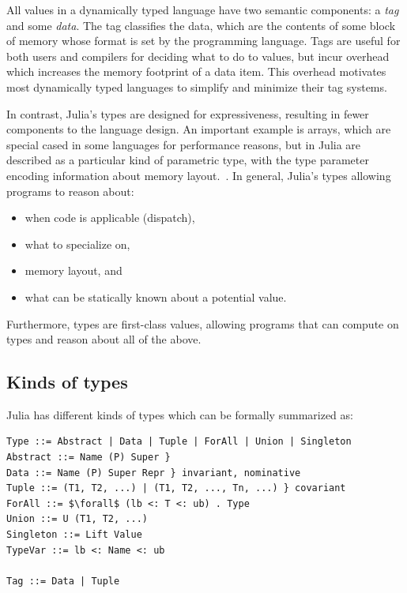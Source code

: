 \documentclass[pldi]{sigplanconf-pldi15}
\begin{document}
All values in a dynamically typed language have two semantic components:
a \emph{tag} and some \emph{data}. The tag classifies the data, which are the
contents of some block of memory whose format is set by the programming
language. Tags are useful for both users and compilers for deciding what to do
to values, but incur overhead which increases the memory footprint of a data
item. This overhead motivates most dynamically typed languages to simplify and
minimize their tag systems.

In contrast, Julia's types are designed for expressiveness, resulting in fewer
components to the language design. An important example is arrays, which are
special cased in some languages for performance reasons, but in Julia are
described as a particular kind of parametric type, with the type parameter
encoding information about memory layout.~\cite{Bezanson2014}. In general,
Julia's types allowing programs to reason about:

\begin{itemize}
\item when code is applicable (dispatch),
\item what to specialize on,
\item memory layout, and
\item what can be statically known about a potential value.
\end{itemize}
%
Furthermore, types are first-class values, allowing programs that can compute
on types and reason about all of the above.


\subsection{Kinds of types}

Julia has different kinds of types which can be formally summarized as:

\begin{lstlisting}
Type ::= Abstract | Data | Tuple | ForAll | Union | Singleton
Abstract ::= Name (P) Super }
Data ::= Name (P) Super Repr } invariant, nominative
Tuple ::= (T1, T2, ...) | (T1, T2, ..., Tn, ...) } covariant
ForAll ::= $\forall$ (lb <: T <: ub) . Type
Union ::= U (T1, T2, ...)
Singleton ::= Lift Value
TypeVar ::= lb <: Name <: ub

Tag ::= Data | Tuple
\end{lstlisting}
\end{document}
